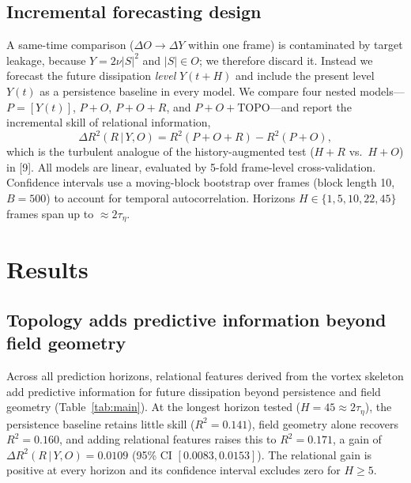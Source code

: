 \documentclass[11pt,a4paper]{article}
\begin{document}
\subsection{Incremental forecasting design}
A same-time comparison ($\Delta O \rightarrow \Delta Y$ within one frame) is contaminated by target leakage, because $Y = 2\nu|S|^2$ and $|S| \in O$; we therefore discard it. Instead we forecast the future dissipation \emph{level} $Y(t+H)$ and include the present level $Y(t)$ as a persistence baseline in every model. We compare four nested models---$P = [Y(t)]$, $P{+}O$, $P{+}O{+}R$, and $P{+}O{+}\mathrm{TOPO}$---and report the incremental skill of relational information,
\begin{equation}
\Delta R^2(R\,|\,Y,O) = R^2(P{+}O{+}R) - R^2(P{+}O),
\end{equation}
which is the turbulent analogue of the history-augmented test ($H{+}R$ vs.\ $H{+}O$) in [9]. All models are linear, evaluated by 5-fold frame-level cross-validation. Confidence intervals use a moving-block bootstrap over frames (block length 10, $B=500$) to account for temporal autocorrelation. Horizons $H \in \{1,5,10,22,45\}$ frames span up to $\approx 2\tau_\eta$.

\section{Results}

\subsection{Topology adds predictive information beyond field geometry}
Across all prediction horizons, relational features derived from the vortex skeleton add predictive information for future dissipation beyond persistence and field geometry (Table~\ref{tab:main}). At the longest horizon tested ($H = 45 \approx 2\tau_\eta$), the persistence baseline retains little skill ($R^2 = 0.141$), field geometry alone recovers $R^2 = 0.160$, and adding relational features raises this to $R^2 = 0.171$, a gain of $\Delta R^2(R\,|\,Y,O) = 0.0109$ (95\% CI $[0.0083, 0.0153]$). The relational gain is positive at every horizon and its confidence interval excludes zero for $H \geq 5$.
\end{document}

